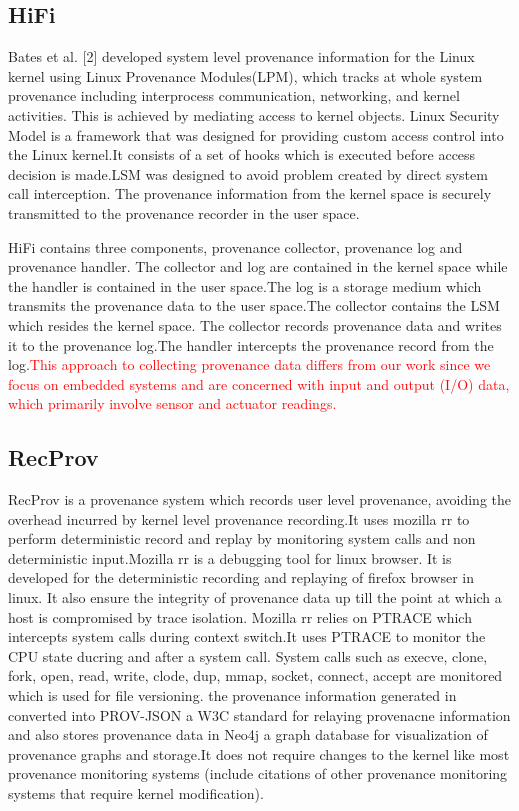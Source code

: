 \subsection{HiFi}
Bates et al. [2] developed system level provenance information for the Linux kernel using Linux Provenance Modules(LPM), which tracks at whole system provenance including interprocess communication, networking, and kernel activities. This is achieved by mediating access to kernel objects. Linux Security Model is a framework that was designed for providing custom access control into the Linux kernel.It consists of a set of hooks which is executed before access decision is made.LSM was designed to avoid problem created by direct system call interception. The provenance information from the kernel space is securely transmitted to the provenance recorder in the user space. 
\par HiFi contains three components, provenance collector, provenance log and provenance handler. The collector and log are contained in the kernel space while the handler is contained in the user space.The log is a storage medium which transmits the provenance data to the user space.The collector contains the LSM which resides the kernel space. The collector records provenance data and writes it to the provenance log.The handler intercepts the provenance record from the log.\textcolor{red}{This approach to collecting provenance data differs from our work since we focus on embedded systems and are concerned with input and output (I/O) data, which primarily involve sensor and actuator readings.}

\subsection{RecProv}

RecProv is a provenance system which records user level provenance, avoiding the overhead incurred by kernel level provenance recording.It uses mozilla rr to perform deterministic record and replay by monitoring system calls  and non deterministic input.Mozilla rr is a debugging tool for linux browser. It is developed for the deterministic recording and replaying of firefox browser in linux. It also ensure the integrity of provenance data up till the point at which a host is compromised by trace isolation. Mozilla rr relies on PTRACE which intercepts system calls during context switch.It uses PTRACE to monitor the CPU state ducring and after a system call. System calls such as execve, clone, fork, open, read, write, clode, dup, mmap, socket, connect, accept are monitored which is used for file versioning. the provenance information generated in converted into PROV-JSON a W3C standard for relaying provenacne information and also stores provenance data in Neo4j a graph database for visualization of provenance graphs and storage.It does not require changes to the kernel like most provenance monitoring systems (include citations of other provenance monitoring systems that require kernel modification). 

